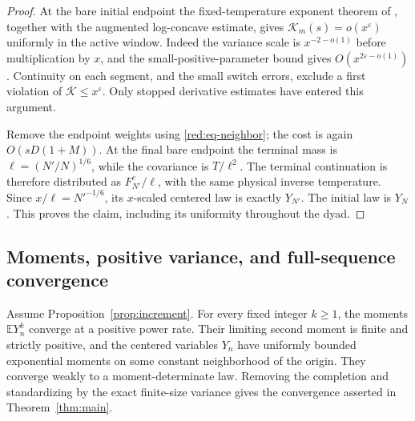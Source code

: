 \begin{proof}
At the bare initial endpoint the fixed-temperature exponent theorem
of \cite[Theorem~1.1]{PE}, together with the augmented
log-concave estimate, gives
\(\mathcal K_m(s)=o(x^\varepsilon)\) uniformly in the active window.
Indeed the variance scale is \(x^{-2-o(1)}\) before multiplication
by \(x\), and the small-positive-parameter bound gives
\(O(x^{2\varepsilon-o(1)})\). Continuity on each segment, and the
small switch errors, exclude a first violation of
\(\overline{\mathcal K}\le x^\varepsilon\). Only stopped derivative
estimates have entered this argument.

Remove the endpoint weights using \eqref{red:eq-neighbor}; the cost
is again \(O(sD(1+M))\). At the final bare endpoint the terminal mass
is \(\ell=(N'/N)^{1/6}\), while the covariance is \(T/\ell^2\).
The terminal continuation is therefore distributed as
\(F_{N'}^c/\ell\), with the same physical inverse temperature.
Since \(x/\ell=N'^{-1/6}\), its \(x\)-scaled centered law is exactly
\(Y_{N'}\). The initial law is \(Y_N\). This proves the claim,
including its uniformity throughout the dyad.
\end{proof}

\subsection{Moments, positive variance, and full-sequence convergence}

\begin{proposition}\label{red:prop-moments}
Assume Proposition~\ref{prop:increment}. For every fixed integer
\(k\ge1\), the moments \(\mathbb EY_n^k\) converge at a positive
power rate. Their limiting second moment is finite and strictly
positive, and the centered variables \(Y_n\) have uniformly bounded
exponential moments on some constant neighborhood of the origin.
They converge weakly to a moment-determinate law. Removing the
completion and standardizing by the exact finite-size variance gives
the convergence asserted in Theorem~\ref{thm:main}.
\end{proposition}

